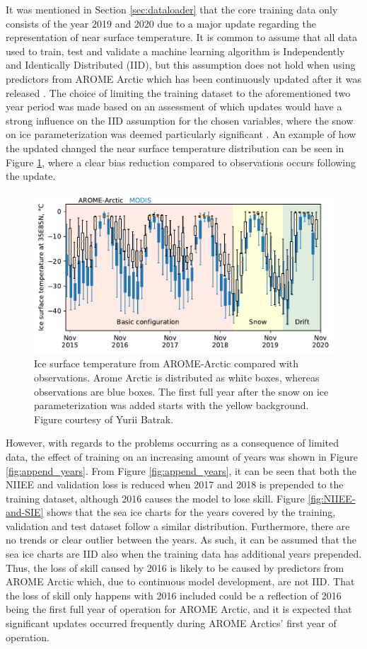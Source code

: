 \documentclass[../main/thesis]{subfiles}
\begin{document}
It was mentioned in Section \ref{sec:dataloader} that the core training data only consists of the year 2019 and 2020 due to a major update regarding the representation of near surface temperature. It is common to assume that all data used to train, test and validate a machine learning algorithm is Independently and Identically Distributed (IID), but this assumption does not hold when using predictors from AROME Arctic which has been continuously updated after it was released \citep{Mueller2017}. The choice of limiting the training dataset to the aforementioned two year period was made based on an assessment of which updates would have a strong influence on the IID assumption for the chosen variables, where the snow on ice parameterization was deemed particularly significant \citep{Batrak2019}. An example of how the updated changed the near surface temperature distribution can be seen in Figure \ref{fig:aa-history}, where a clear bias reduction compared to observations occurs following the update.

\begin{figure}
    \centering
    \includegraphics[width=.9\textwidth]{aa-history}
    \caption{\label{fig:aa-history}Ice surface temperature from AROME-Arctic compared with observations. Arome Arctic is distributed as white boxes, whereas observations are blue boxes. The first full year after the snow on ice parameterization was added starts with the yellow background. Figure courtesy of Yurii Batrak.}
\end{figure}

However, with regards to the problems occurring as a consequence of limited data, the effect of training on an increasing amount of years was shown in Figure \ref{fig:append_years}. From Figure \ref{fig:append_years}, it can be seen that both the NIIEE and validation loss is reduced when 2017 and 2018 is prepended to the training dataset, although 2016 causes the model to lose skill. Figure \ref{fig:NIIEE-and-SIE} shows that the sea ice charts for the years covered by the training, validation and test dataset follow a similar distribution. Furthermore, there are no trends or clear outlier between the years. As such, it can be assumed that the sea ice charts are IID also when the training data has additional years prepended. Thus, the loss of skill caused by 2016 is likely to be caused by predictors from AROME Arctic which, due to continuous model development, are not IID. That the loss of skill only happens with 2016 included could be a reflection of 2016 being the first full year of operation for AROME Arctic, and it is expected that significant updates occurred frequently during AROME Arctics' first year of operation.
\end{document}
